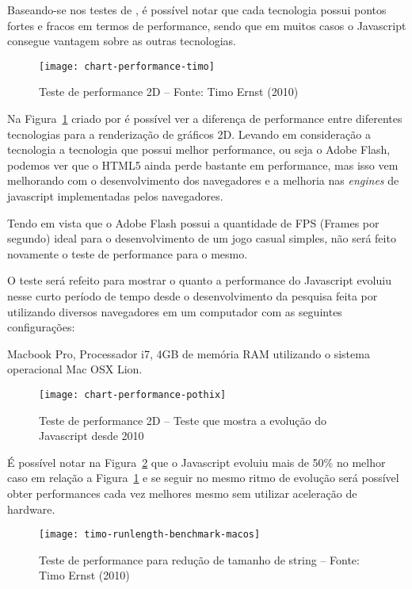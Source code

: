 Baseando-se nos testes de , é possível notar que
cada tecnologia possui pontos fortes e fracos em termos de performance, sendo que
em muitos casos o Javascript consegue vantagem sobre as outras tecnologias.

\begin{figure}[H]
  \centering
	\texttt{[image: chart-performance-timo]}
  \caption{Teste de performance 2D {--} Fonte: Timo Ernst (2010)}
  \label{img:chart-performance-timo}
\end{figure}

Na Figura~\ref{img:chart-performance-timo} criado por  é
possível ver a diferença de performance entre diferentes tecnologias para a
renderização de gráficos 2D.
Levando em consideração a tecnologia a tecnologia que possui melhor performance,
ou seja o Adobe Flash, podemos ver que o HTML5 ainda perde bastante em performance,
mas isso vem melhorando com o desenvolvimento dos navegadores e a melhoria nas
\textit{engines} de javascript implementadas pelos navegadores.

Tendo em vista que o Adobe Flash possui a quantidade de FPS (Frames por segundo) ideal
para o desenvolvimento de um jogo casual simples, não será feito novamente o teste de
performance para o mesmo.

O teste será refeito para mostrar o quanto a performance do Javascript evoluiu nesse curto
período de tempo desde o desenvolvimento da pesquisa feita por 
utilizando diversos navegadores em um computador com as seguintes configurações:

Macbook Pro, Processador i7, 4GB de memória RAM utilizando o sistema
operacional Mac OSX Lion.

\begin{figure}[H]
  \centering
	\texttt{[image: chart-performance-pothix]}
  \caption{Teste de performance 2D {--} Teste que mostra a evolução do
  Javascript desde 2010}
  \label{img:chart-performance-pothix}
\end{figure}

É possível notar na Figura~\ref{img:chart-performance-pothix} que o
Javascript evoluiu mais de 50\% no melhor caso
em relação a Figura~\ref{img:chart-performance-timo} e se seguir no mesmo ritmo de evolução
será possível obter performances cada vez melhores mesmo sem utilizar aceleração de
hardware.

\begin{figure}[H]
  \centering
	\texttt{[image: timo-runlength-benchmark-macos]}
  \caption{Teste de performance para redução de tamanho de string {--} Fonte: Timo Ernst (2010)}
  \label{img:timo-runlength-benchmark-macos}
\end{figure}

